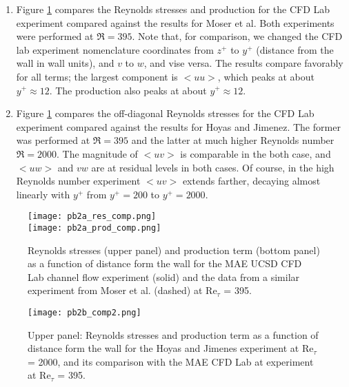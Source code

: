 \documentclass[11pt]{article}
\begin{document}
\begin{enumerate}[label=(\alph*)]
    \item Figure \ref{fig:my_stress} compares the Reynolds stresses and production for the CFD Lab experiment compared against the results for Moser et al. Both experiments were performed at $\Re = 395$. Note that, for comparison, we changed the CFD lab experiment nomenclature coordinates from $z^+$ to $y^+$ (distance from the wall in wall units), and $v$ to $w$, and vise versa. The results compare favorably for all terms; the largest component is  $<uu>$, which peaks at about $y^+ \approx 12$. The production also peaks at about $y^+ \approx 12$.

  \item Figure \ref{fig:my_stress} compares the off-diagonal Reynolds stresses for the CFD Lab experiment compared against the results for Hoyas and Jimenez. The former was performed at $\Re = 395$ and the latter at much higher Reynolds number $\Re = 2000$. The magnitude of $<uv>$ is comparable in the both case, and $<uw>$ and $vw$ are at residual levels in both cases.  Of course, in the high Reynolds number experiment $<uv>$ extends farther, decaying almost linearly with $y^+$ from $y^+=200$ to $y^+=2000$.

\end{enumerate}

\begin{figure}[ht]
\begin{center}
\texttt{[image: pb2a\_res\_comp.png]}\\
\texttt{[image: pb2a\_prod\_comp.png]}
\end{center}
\caption{Reynolds stresses (upper panel) and production term (bottom panel) as a function of distance form the wall for the MAE UCSD CFD Lab channel flow experiment (solid) and the data from a similar experiment from Moser et al. (dashed) at Re$_\tau$ = 395.}
\label{fig:my_stress}
\end{figure}

\begin{figure}[ht]
\begin{center}
\texttt{[image: pb2b\_comp2.png]}
\end{center}
\caption{Upper panel: Reynolds stresses and production term as a function of distance form the wall for the Hoyas and Jimenes experiment at Re$_\tau$ = 2000, and its comparison with the MAE CFD Lab at experiment at Re$_\tau$ = 395.}
\label{fig:stress2}
\end{figure}
\end{document}
